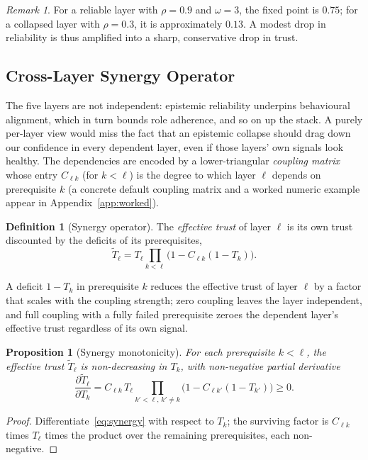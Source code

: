 \documentclass[sigconf,anonymous]{acmart}
\theoremstyle{plain}
\newtheorem{proposition}{Proposition}
\theoremstyle{definition}
\newtheorem{definition}{Definition}
\theoremstyle{remark}
\newtheorem{remark}{Remark}
\begin{document}
\begin{remark}
For a reliable layer with $\rho=0.9$ and $\omega=3$, the fixed point is $0.75$; for a
collapsed layer with $\rho=0.3$, it is approximately $0.13$. A modest drop in reliability
is thus amplified into a sharp, conservative drop in trust.
\end{remark}

\subsection{Cross-Layer Synergy Operator}
The five layers are not independent: epistemic reliability underpins behavioural
alignment, which in turn bounds role adherence, and so on up the stack. A purely
per-layer view would miss the fact that an epistemic collapse should drag down our
confidence in every dependent layer, even if those layers' own signals look healthy. The
dependencies are encoded by a lower-triangular \emph{coupling matrix} whose entry
$C_{\ell k}$ (for $k<\ell$) is the degree to which layer $\ell$ depends on prerequisite
$k$ (a concrete default coupling matrix and a worked numeric example appear in
Appendix~\ref{app:worked}).

\begin{definition}[Synergy operator]
\label{def:synergy}
The \emph{effective trust} of layer $\ell$ is its own trust discounted by the deficits of
its prerequisites,
\begin{equation}
\tilde T_\ell = T_\ell\prod_{k<\ell}\bigl(1-C_{\ell k}(1-T_k)\bigr).
\label{eq:synergy}
\end{equation}
\end{definition}

A deficit $1-T_k$ in prerequisite $k$ reduces the effective trust of layer $\ell$ by a
factor that scales with the coupling strength; zero coupling leaves the layer
independent, and full coupling with a fully failed prerequisite zeroes the dependent
layer's effective trust regardless of its own signal.

\begin{proposition}[Synergy monotonicity]
\label{prop:monotone}
For each prerequisite $k<\ell$, the effective trust $\tilde T_\ell$ is non-decreasing in
$T_k$, with non-negative partial derivative
\begin{equation}
\frac{\partial\tilde T_\ell}{\partial T_k}
= C_{\ell k}\,T_\ell\!\!\prod_{k'<\ell,\,k'\ne k}\!\!\bigl(1-C_{\ell k'}(1-T_{k'})\bigr)\ge0.
\label{eq:monotone}
\end{equation}
\end{proposition}
\begin{proof}
Differentiate~\eqref{eq:synergy} with respect to $T_k$; the surviving factor is
$C_{\ell k}$ times $T_\ell$ times the product over the remaining prerequisites, each
non-negative.
\end{proof}
\end{document}
